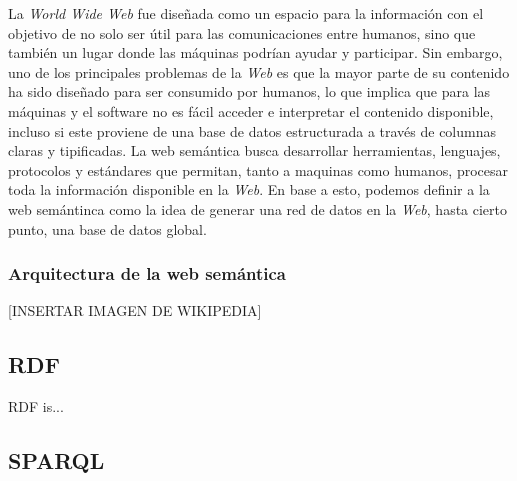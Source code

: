 \documentclass[conference,compsoc]{IEEEtran}
\begin{document}
La \textit{World Wide Web} fue diseñada como un espacio para la información con el objetivo de no solo ser
útil para las comunicaciones entre humanos, sino que también un lugar donde las máquinas podrían ayudar y participar.
Sin embargo, uno de los principales problemas de la \textit{Web} es que la mayor parte de su contenido ha sido
diseñado para ser consumido por humanos, lo que implica que para las máquinas y el software no es fácil acceder 
e interpretar el contenido disponible, incluso si este proviene de una base de datos estructurada a través de
columnas claras y tipificadas. La web semántica busca desarrollar herramientas,
lenguajes, protocolos y estándares que permitan, tanto a maquinas como humanos, procesar toda la información disponible en la
\textit{Web}. En base a esto, podemos definir a la web semántinca como la idea de generar
una red de datos en la \textit{Web}, hasta cierto punto, una base de datos global. \cite{berners1998semantic}

    \subsubsection{Arquitectura de la web semántica}

[INSERTAR IMAGEN DE WIKIPEDIA]

    \subsection{RDF}

    RDF is...

    \subsection{SPARQL}



\end{document}
